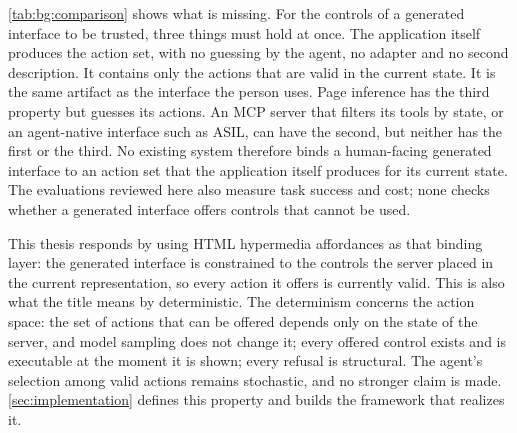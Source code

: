 \autoref{tab:bg:comparison} shows what is missing.
For the controls of a generated interface to be trusted, three things must hold at once.
The application itself produces the action set, with no guessing by the agent, no adapter and no second description.
It contains only the actions that are valid in the current state.
It is the same artifact as the interface the person uses.
Page inference has the third property but guesses its actions.
An MCP server that filters its tools by state, or an agent-native interface such as ASIL, can have the second, but neither has the first or the third.
No existing system therefore binds a human-facing generated interface to an action set that the application itself produces for its current state.
The evaluations reviewed here also measure task success and cost; none checks whether a generated interface offers controls that cannot be used.

This thesis responds by using HTML hypermedia affordances as that binding layer: the generated interface is constrained to the controls the server placed in the current representation, so every action it offers is currently valid.
This is also what the title means by deterministic.
The determinism concerns the action space: the set of actions that can be offered depends only on the state of the server, and model sampling does not change it; every offered control exists and is executable at the moment it is shown; every refusal is structural.
The agent's selection among valid actions remains stochastic, and no stronger claim is made.
\autoref{sec:implementation} defines this property and builds the framework that realizes it.
